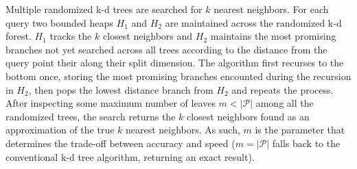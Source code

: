 Multiple randomized k-d trees are searched for $k$ nearest neighbors. For each query two bounded heaps $H_{1}$ and $H_{2}$ are maintained across the randomized k-d forest. $H_{1}$ tracks the $k$ closest neighbors and $H_{2}$ maintains the most promising branches not yet searched across all trees according to the distance from the query point their along their split dimension. The algorithm first recurses to the bottom once, storing the most promising branches encounted during
the recursion in $H_{2}$, then pops the lowest distance branch from $H_{2}$ and repeats the process. After inspecting some maximum number of leaves $m<\left|\mathcal{P}\right|$ among all the randomized trees, the search returns the $k$ closest neighbors found as an approximation of the true $k$ nearest neighbors. As such, $m$ is the parameter that determines the trade-off between accuracy and speed ($m=\left|\mathcal{P}\right|$ falls back to the conventional k-d tree
algorithm, returning an exact result).




